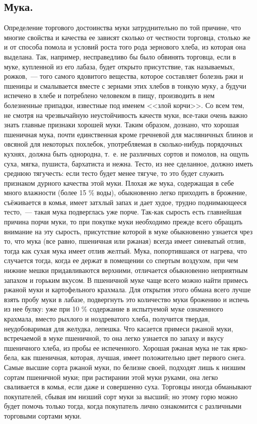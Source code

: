 \subsection{Мука.}
Определение торгового достоинства муки затруднительно по той причине, что многие свойства и качества ее зависят сколько от честности торговца, столько же и от способа помола и условий роста того рода зернового хлеба, из которая она выделана. Так, например, несправедливо бы было обвинять торговца, если в муке, купленной из его лабаза, будет открыто присутствие, так называемых, рожков,~--- того самого ядовитого вещества, которое составляет болезнь ржи и пшеницы и смалывается вместе с зернами этих хлебов в тонкую муку, а будучи испечено в хлебе и потреблено человеком в пищу, производить в нем болезненные припадки, известные под именем <<злой корчи>>. Со всем тем, не смотря на чрезвычайную неустойчивость качеств муки, все-таки очень важно знать главные признаки хорошей муки. Таким образом, дознано, что хорошая пшеничная мука, почти единственная кроме гречневой для масляничных блинов и овсяной для некоторых похлебок, употребляемая в сколько-нибудь порядочных кухнях, должна быть однородна, т.~е. не различных сортов и помолов, на ощупь суха, мягка, пушиста, бархатиста и нежна. Тесто, из нее сделанное, должно иметь среднюю тягучесть: если тесто будет менее тягуче, то это будет служить признаком дурного качества этой муки. Плохая же мука, содержащая в себе много влажности (более 15 \% воды), обыкновенно легко приходить в брожение, съёживается в комья, имеет затхлый запах и дает худое, трудно поднимающееся тесто,~--- такая мука подверглась уже порче. Так-как сырость есть главнейшая причина порчи муки, то при покупке муки необходимо прежде всего обращать внимание на эту сырость, присутствие которой в муке обыкновенно узнается чрез то, что мука (все равно, пшеничная или ржаная) всегда имеет синеватый отлив, тогда как сухая мука имеет отлив желтый. Мука, попортившаяся от нагрева, что случается тогда, когда ее держат в помещении со спертым воздухом, при чем нижние мешки придавливаются верхними, отличается обыкновенно неприятным запахом и горьким вкусом. В пшеничной муке чаще всего можно найти примесь ржаной муки и картофельного крахмала. Для открытия этого обмана всего лучше взять пробу муки в лабазе, подвергнуть это количество муки брожению и испечь из нее булку: уже при 10 \% содержание в испытуемой муке означенного крахмала, вместо рыхлого и ноздреватого хлеба, получится твердая, неудобоваримая для желудка, лепешка. Что касается примеси ржаной муки, встречаемой в муке пшеничной, то она легко узнается по запаху и вкусу пшеничного хлеба, из пробы ее испеченного. Хорошая ржаная мука не так ярко-бела, как пшеничная, которая, лучшая, имеет положительно цвет первого снега. Самые высшие сорта ржаной муки, по белизне своей, подходят лишь к низшим сортам пшеничной муки; при растирании этой муки руками, она легко сваливается в комья, если даже и совершенно суха. Торговцы иногда обманывают покупателей, сбывая им низший сорт муки за высший; но этому горю можно будет помочь только тогда, когда покупатель лично ознакомится с различными торговыми сортами муки.

